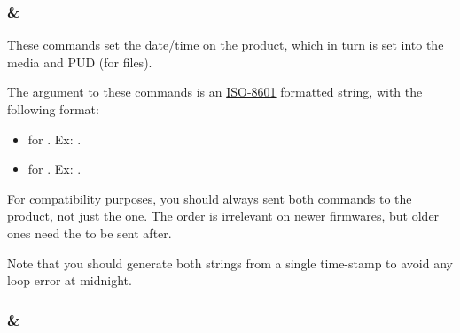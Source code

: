 \begin{table}[h]
\centering
{}
\caption{Final command for each Settings/State request}
\end{table}

\subsubsection{ \&\\}

These commands set the date/time on the product, which in turn is set into the media and PUD (for  files).

The argument to these commands is an \href{https://en.wikipedia.org/wiki/ISO_8601}{ISO-8601} formatted string, with the following format:
\begin{itemize}
\item{ for . Ex: .}
\item{ for . Ex: .}
\end{itemize}

For compatibility purposes, you should always sent both commands to the product, not just the  one. The order is irrelevant on newer firmwares, but older ones need the  to be sent after.

Note that you should generate both strings from a single time-stamp to avoid any loop error at midnight.

\subsubsection{ \&\\}

